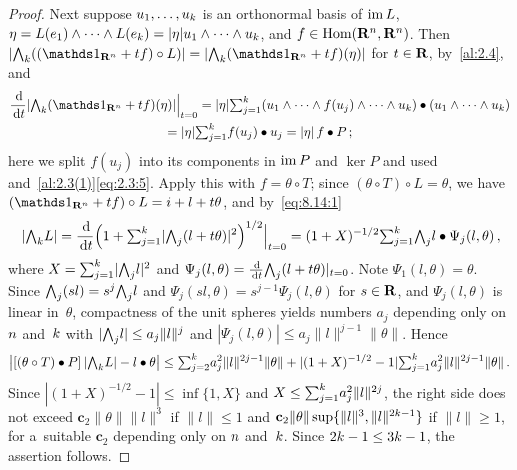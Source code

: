 \begin{proof}
    Next suppose $u_1, \ldots, u_{k}$ is an orthonormal basis of $\operatorname{im} L$, $\eta = L(e_1) \wedge
    \cdots \wedge L(e_{k}) = |\eta| u_1 \wedge \cdots \wedge u_{k}$, and $f \in
    \operatorname{Hom}(\mathbf{R}^{n}, \mathbf{R}^{n})$. Then $|\extpower{\vdim} ((\id{\R^{\adim}} + t f) \circ L)| =
    |\extpower{\vdim}(\id{\R^{\adim}} + t f)(\eta)|$ for $t \in \mathbf{R}$, by~\ref{al:2.4}, and
    \begin{multline*}
        \frac{\ud}{\ud t} |\extpower{\vdim}(\id{\R^{\adim}} + t f)(\eta)| \Big|_{t=0} = |\eta|
        \textsum{j=1}{\vdim} (u_1 \wedge \cdots \wedge f(u_j) \wedge \cdots \wedge u_{\vdim}) \bullet
        (u_1 \wedge \cdots \wedge u_{\vdim}) \\ = |\eta| \textsum{j=1}{\vdim} f(u_j) \bullet u_j = |\eta|
        \, f \bullet P \,;
    \end{multline*}
    here we split $f(u_j)$ into its components in $\operatorname{im} P$ and $\ker P$ and used~\cite[1.7.5]{Federer1969}
    and~\ref{al:2.3(1)}\eqref{eq:2.3:5}. Apply this with $f = \theta \circ T$; since $(\theta \circ
    T) \circ L = \theta$, we have $(\id{\R^{\adim}} + t f) \circ L = i + l + t \theta$, and
    by~\eqref{eq:8.14:1}
    \begin{displaymath}
        [(\theta \circ T) \bullet P] \, |\extpower{\vdim} L| = \frac{\ud}{\ud t} \Big( 1 +
        \textsum{j=1}{\vdim} |\extpower{j}(l + t \theta)|^2 \Big)^{1/2} \Big|_{t=0} = (1 + X)^{-1/2}
        \textsum{j=1}{\vdim} \extpower{j} l \bullet \Psi_j(l,\theta) \,,
    \end{displaymath}
    where $X = {\textstyle\sum_{j=1}^{k}} |{\textstyle\boldsymbol{\bigwedge}}_{{j}} l|^2$ and $\Psi_j(l,\theta) = \frac{\,\mathrm{d}}{\,\mathrm{d} t}
    {\textstyle\boldsymbol{\bigwedge}}_{{j}}(l + t \theta) |_{t=0}$. Note $\Psi_1(l,\theta) = \theta$. Since ${\textstyle\boldsymbol{\bigwedge}}_{{j}}(s l)
    = s^j {\textstyle\boldsymbol{\bigwedge}}_{{j}} l$ and $\Psi_j(s l, \theta) = s^{j-1} \Psi_j(l,\theta)$ for $s \in \mathbf{R}$, and
    $\Psi_j(l,\theta)$ is linear in~$\theta$, compactness of the unit spheres yields numbers $a_j$
    depending only on $n$ and~$k$ with $|{\textstyle\boldsymbol{\bigwedge}}_{{j}} l| \le a_j \|l\|^j$ and
    $|\Psi_j(l,\theta)| \le a_j \|l\|^{j-1} \|\theta\|$. Hence
    \begin{displaymath}
        \big| [(\theta \circ T) \bullet P] \, |{\textstyle\boldsymbol{\bigwedge}}_{{k}} L| - l \bullet \theta \big| \le
        {\textstyle\sum_{j=2}^{k}} a_j^2 \|l\|^{2j-1} \|\theta\| + |(1 + X)^{-1/2} - 1|
        {\textstyle\sum_{j=1}^{k}} a_j^2 \|l\|^{2j-1} \|\theta\| \,.
    \end{displaymath}
    Since $|(1 + X)^{-1/2} - 1| \le \inf \{ 1, X \}$ and $X \le {\textstyle\sum_{j=1}^{k}} a_j^2
    \|l\|^{2j}$, the right side does not exceed $\mathbf{c}_2 \|\theta\| \|l\|^3$ if $\|l\| \le 1$
    and $\mathbf{c}_2 \|\theta\| \sup \{ \|l\|^3, \|l\|^{2 k - 1} \}$ if $\|l\| \ge 1$, for
    a~suitable $\mathbf{c}_2$ depending only on $n$ and~$k$. Since $2 k - 1 \le 3 k -
    1$, the assertion follows.
\end{proof}

